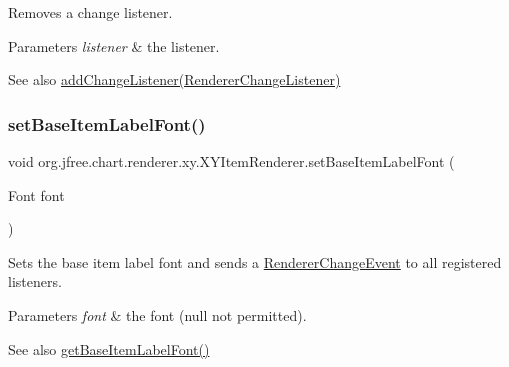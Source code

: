 Removes a change listener.


\begin{DoxyParams}{Parameters}
{\em listener} & the listener.\\
\hline
\end{DoxyParams}
\begin{DoxySeeAlso}{See also}
\mbox{\hyperlink{interfaceorg_1_1jfree_1_1chart_1_1renderer_1_1xy_1_1_x_y_item_renderer_aa4a7632bcaa644d55cc0c85fc754f0ca}{add\+Change\+Listener(\+Renderer\+Change\+Listener)}} 
\end{DoxySeeAlso}
\mbox{\label{interfaceorg_1_1jfree_1_1chart_1_1renderer_1_1xy_1_1_x_y_item_renderer_a5ab327bbbdbfa822d87e23e2a0619c62}} 
\subsubsection{\texorpdfstring{set\+Base\+Item\+Label\+Font()}{setBaseItemLabelFont()}}
{\footnotesize\ttfamily void org.\+jfree.\+chart.\+renderer.\+xy.\+X\+Y\+Item\+Renderer.\+set\+Base\+Item\+Label\+Font (\begin{DoxyParamCaption}\item[{Font}]{font }\end{DoxyParamCaption})}

Sets the base item label font and sends a \mbox{\hyperlink{}{Renderer\+Change\+Event}} to all registered listeners.


\begin{DoxyParams}{Parameters}
{\em font} & the font ({\ttfamily null} not permitted).\\
\hline
\end{DoxyParams}
\begin{DoxySeeAlso}{See also}
\mbox{\hyperlink{interfaceorg_1_1jfree_1_1chart_1_1renderer_1_1xy_1_1_x_y_item_renderer_a45bb73763c2f4ec4c212350abaf7a5b5}{get\+Base\+Item\+Label\+Font()}} 
\end{DoxySeeAlso}
\mbox{\label{interfaceorg_1_1jfree_1_1chart_1_1renderer_1_1xy_1_1_x_y_item_renderer_adb2a89010f4e58e1b4efc1a0e4c1df22}} 
